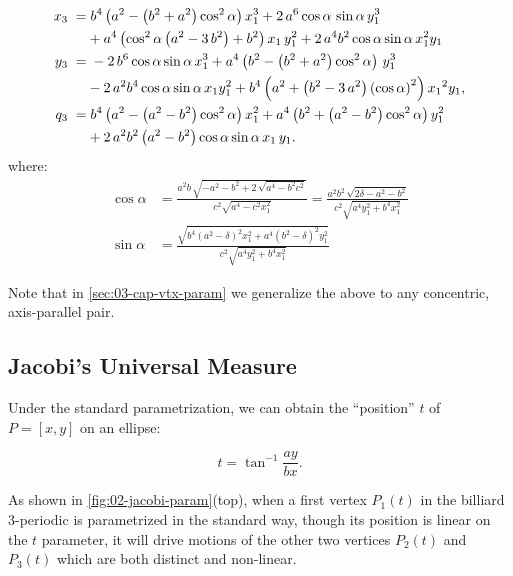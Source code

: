  \begin{equation} \label{eq:02-p3} \aligned 
x_{3}\; =& \; {b}^{4} \left( {a}^{2}- \left( {b}^{2}+{a}^{2} \right) 
 \cos^{2}\alpha\right)   x_1^{3}+2\, {a}^{6} 
 \cos \alpha\,\sin \alpha\, y_1^{3}\\
 &+{a}^{4} \left( 
  \cos^{2}  \alpha  \left( {a}^{2}-3\,{b}^{2}
 \right) +{b}^{2} \right) { x_1}\, y_1^{2}+2\,{a}^{4}{b}^{2} \cos  \alpha\sin \alpha\,   x_1^{2}{ y_1}
\\
y_{3} \;=&\; -2\, {b}^{6} \cos \alpha\sin \alpha\, x_1^{3}+
{a}^{4} \left( {b}^{2}- \left( {b}^{2}+{a}^{2} \right)   \cos^{2}  \alpha  \right)\,  y_1^{3}\\
& -2\,{a}^{2}  {b}^{4}\cos
 \alpha  \sin \alpha\,  x_1 y_1^{2}+
{b}^{4} \left( {a}^{2}+ \left( {b}^{2}-3\,{a}^{2} \right)  \left( \cos
 \alpha  \right) ^{2} \right) {{ x_1}}^{2}{ y_1},
\\
q_3 \;=& \; {b}^{4} \left( {a}^{2}- \left(a^2 -{b}^{2}  \right)   \cos^{2} \alpha   \right) x_1^{2}+{a}^{4} \left( {b}^{2}+ \left( a^2-{b}^{2}  \right)  \cos^{2} \alpha  \right)  y_1^{2}\\
&+2\,{a}^{2}{b}^{
2} \left( {a}^{2}-{b}^{2} \right) \cos \alpha \sin \alpha\, { x_1}\,{ y_1}.
\endaligned
%
\end{equation}
where:
\begin{align*}
\cos \alpha &={\frac {a^2 b  \, \sqrt {-{a}^{2}-{b}^{2}+2\,\sqrt {{a}^{4}-{b}^{2}{c}^{2}}}}{{c}^{2}\sqrt {{a}^{4}-{c}^{2} x_1^{2}}}}=
\frac{  a^2 b^2 \, \sqrt {2\delta-{a}^{2}-{b}^{2}}} {c^2\sqrt{ a^4y_1^2 + b^4x_1^2}  } \\
\sin\alpha &=\frac { 
\sqrt{{b}^{4} \left( {a}^{2}-\delta \right) ^{2}x_1^{2}+{a}^{
4} \left( {b}^{2}-\delta \right) ^{2}y_1^2}} { c^2\sqrt{  {a}^{4} y_1^{2}+{b}^{4}x_1^{2}   }  }
%
\end{align*}

Note that in \cref{sec:03-cap-vtx-param} we generalize the above to any concentric, axis-parallel pair.

\subsection{Jacobi's Universal Measure}
\label{sec:02-confocal-jacobi-param}

Under the standard parametrization, we can obtain the ``position'' $t$ of $P=[x,y]$ on an ellipse:

\[ t=\tan^{-1}{\frac{a y}{b x}}. \]

As shown in \cref{fig:02-jacobi-param}(top), when a first vertex $P_1(t)$ in the billiard 3-periodic is parametrized in the standard way, though its position is linear on the $t$ parameter, it will drive motions of the other two vertices $P_2(t)$ and $P_3(t)$ which are both distinct and non-linear. 

